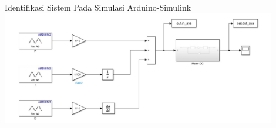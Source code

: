 \documentclass[10pt,xcolor={dvipsnames}]{beamer}
\begin{document}



\begin{frame}{Identifikasi Sistem Pada Simulasi Arduino-Simulink}
	\centering
	\includegraphics[width=12cm]{Hasil Matlab/blokdiagramident.jpg}
\end{frame}
\end{document}
